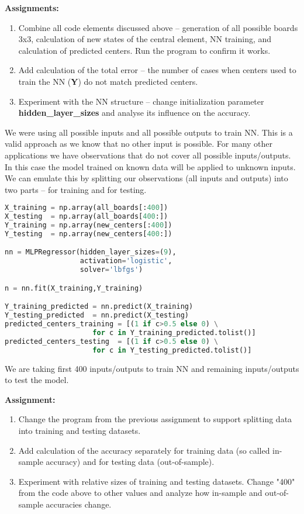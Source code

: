 \begin{tcolorbox}
\textbf{Assignments:}
\begin{enumerate}
\item Combine all code elements discussed above -- generation
of all possible boards 3x3, calculation of new states of the
central element, NN training, and calculation of predicted centers.
Run the program to confirm it works.
\item Add calculation of the total error -- the number of cases
when centers used to train the NN (\textbf{Y}) do not match 
predicted centers.
\item Experiment with the NN structure -- change initialization
parameter \textbf{hidden\_layer\_sizes} and analyse its influence
on the accuracy.
\end{enumerate}
\end{tcolorbox}

We were using all possible inputs and all possible outputs
to train NN. This is a valid approach as we know that no other
input is possible. For many other applications we have
observations that do not cover all possible inputs/outputs.
In this case the model trained on known data will be applied
to unknown inputs. We can emulate this by splitting our
observations (all inputs and outputs) into two parts -- 
for training and for testing. 

\begin{lstlisting}[language=Python,style=codelst2,caption={Splitting data into training and testing datasets}]
X_training = np.array(all_boards[:400])
X_testing  = np.array(all_boards[400:])
Y_training = np.array(new_centers[:400])
Y_testing  = np.array(new_centers[400:])

nn = MLPRegressor(hidden_layer_sizes=(9),
                  activation='logistic', 
                  solver='lbfgs')

n = nn.fit(X_training,Y_training)

Y_training_predicted = nn.predict(X_training)
Y_testing_predicted  = nn.predict(X_testing)
predicted_centers_training = [(1 if c>0.5 else 0) \
                     for c in Y_training_predicted.tolist()]
predicted_centers_testing  = [(1 if c>0.5 else 0) \
                     for c in Y_testing_predicted.tolist()]
\end{lstlisting}
We are taking first 400 inputs/outputs to train NN
and remaining inputs/outputs to test the model.

\begin{tcolorbox}
\textbf{Assignment:} 
\begin{enumerate}
\item Change the program from the previous
assignment to support splitting data into training and testing
datasets. 
\item Add calculation of the accuracy separately for
training data (so called in-sample accuracy) and for
testing data (out-of-sample). 
\item Experiment with relative sizes of training and testing datasets.
Change "400" from the code above to other values and analyze how
in-sample and out-of-sample accuracies change.
\end{enumerate}
\end{tcolorbox}

